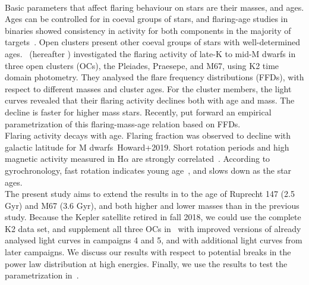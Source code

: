 \documentclass{aa}
\begin{document}
\\
Basic parameters that affect flaring behaviour on stars are their masses, and ages. Ages can be controlled for in coeval groups of stars, and flaring-age studies in binaries showed consistency in activity for both components in the majority of targets~\citep{lurie_kepler_2015, clarke_flare_2018}. Open clusters present other coeval groups of stars with well-determined ages. \citet{ilin_flares_2019}~(hereafter ) investigated the flaring activity of late-K to mid-M dwarfs in three open clusters (OCs), the Pleiades, Praesepe, and M67, using K2 time domain photometry. They analysed the flare frequency distributions (FFDs), with respect to different masses and cluster ages. For the cluster members, the light curves revealed that their flaring activity declines both with age and mass. The decline is faster for higher mass stars. Recently, \citet{davenport_flaresevolve_2019} put forward an empirical parametrization of this flaring-mass-age relation based on FFDs.
\\
Flaring activity decays with age. Flaring fraction was observed to decline with galactic latitude for M dwarfs~\citep{hilton_dwarf_2010}Howard+2019. Short rotation periods and high magnetic activity measured in H$\alpha$ are strongly correlated~\citep{west_magneticrotationage_2015}. According to gyrochronology, fast rotation indicates young age~\citep{barnes_rotational_2003}, and slows down as the star ages. 
\\
The present study aims to extend the results in  to the age of Ruprecht 147 (2.5 Gyr) and M67 (3.6 Gyr), and both higher and lower masses than in the previous study. Because the Kepler satellite retired in fall 2018, we could use the complete K2 data set, and supplement all three OCs in~ with improved versions of already analysed light curves in campaigns 4 and 5, and with additional light curves from later campaigns. We discuss our results with respect to potential breaks in the power law distribution at high energies. Finally, we use the results to test the parametrization in~\citet{davenport_flaresevolve_2019}.
\end{document}
